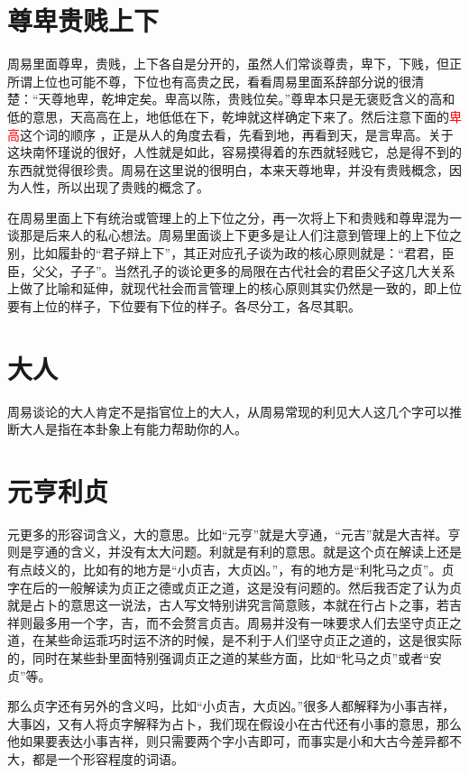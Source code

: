 \documentclass[12pt,oneside]{book}
\renewcommand{\emph}[1]{\textcolor{red}{#1}}
\begin{document}
\section{尊卑贵贱上下}
周易里面尊卑，贵贱，上下各自是分开的，虽然人们常谈尊贵，卑下，下贱，但正所谓上位也可能不尊，下位也有高贵之民，看看周易里面系辞部分说的很清楚：“天尊地卑，乾坤定矣。卑高以陈，贵贱位矣。”尊卑本只是无褒贬含义的高和低的意思，天高高在上，地低低在下，乾坤就这样确定下来了。然后注意下面的\emph{卑高}这个词的顺序 ，正是从人的角度去看，先看到地，再看到天，是言卑高。关于这块南怀瑾说的很好，人性就是如此，容易摸得着的东西就轻贱它，总是得不到的东西就觉得很珍贵。周易在这里说的很明白，本来天尊地卑，并没有贵贱概念，因为人性，所以出现了贵贱的概念了。

在周易里面上下有统治或管理上的上下位之分，再一次将上下和贵贱和尊卑混为一谈那是后来人的私心想法。周易里面谈上下更多是让人们注意到管理上的上下位之别，比如履卦的“君子辩上下”，其正对应孔子谈为政的核心原则就是：“君君，臣臣，父父，子子”。当然孔子的谈论更多的局限在古代社会的君臣父子这几大关系上做了比喻和延伸，就现代社会而言管理上的核心原则其实仍然是一致的，即上位要有上位的样子，下位要有下位的样子。各尽分工，各尽其职。

\section{大人}
周易谈论的大人肯定不是指官位上的大人，从周易常现的利见大人这几个字可以推断大人是指在本卦象上有能力帮助你的人。

\section{元亨利贞}
元更多的形容词含义，大的意思。比如“元亨”就是大亨通，“元吉”就是大吉祥。亨则是亨通的含义，并没有太大问题。利就是有利的意思。就是这个贞在解读上还是有点歧义的，比如有的地方是“小贞吉，大贞凶。”，有的地方是“利牝马之贞”。贞字在后的一般解读为贞正之德或贞正之道，这是没有问题的。然后我否定了认为贞就是占卜的意思这一说法，古人写文特别讲究言简意赅，本就在行占卜之事，若吉祥则最多用一个字，吉，而不会赘言贞吉。周易并没有一味要求人们去坚守贞正之道，在某些命运乖巧时运不济的时候，是不利于人们坚守贞正之道的，这是很实际的，同时在某些卦里面特别强调贞正之道的某些方面，比如“牝马之贞”或者“安贞”等。

那么贞字还有另外的含义吗，比如“小贞吉，大贞凶。”很多人都解释为小事吉祥，大事凶，又有人将贞字解释为占卜，我们现在假设小在古代还有小事的意思，那么他如果要表达小事吉祥，则只需要两个字小吉即可，而事实是小和大古今差异都不大，都是一个形容程度的词语。
\end{document}
